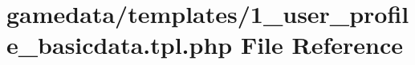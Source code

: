 \hypertarget{1__user__profile__basicdata_8tpl_8php}{\section{gamedata/templates/1\+\_\+user\+\_\+profile\+\_\+basicdata.tpl.\+php File Reference}
\label{1__user__profile__basicdata_8tpl_8php}
}
